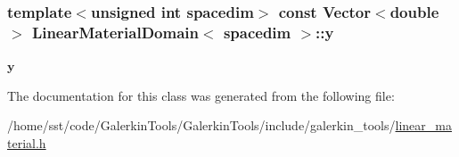 \subsubsection[{\texorpdfstring{y}{y}}]{\setlength{\rightskip}{0pt plus 5cm}template$<$unsigned int spacedim$>$ const {\bf Vector}$<$double$>$ {\bf Linear\+Material\+Domain}$<$ spacedim $>$\+::y\hspace{0.3cm}{\ttfamily [private]}}\hypertarget{class_linear_material_domain_a7ea9ab6930c0b0aa826e809ef245b0e2}{}\label{class_linear_material_domain_a7ea9ab6930c0b0aa826e809ef245b0e2}
$\boldsymbol{y}$ 

The documentation for this class was generated from the following file\+:\begin{DoxyCompactItemize}
\item 
/home/sst/code/\+Galerkin\+Tools/\+Galerkin\+Tools/include/galerkin\+\_\+tools/\hyperlink{linear__material_8h}{linear\+\_\+material.\+h}\end{DoxyCompactItemize}
